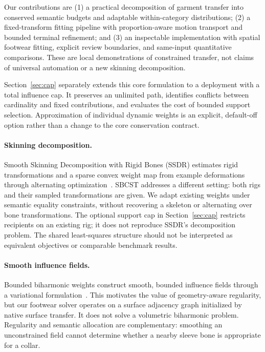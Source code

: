 \documentclass[10pt,twocolumn,letterpaper]{article}
\makeatletter
\renewcommand\section{\@startsection{section}{1}{\z@}{-2.0ex plus -.5ex minus -.2ex}{.9ex plus .2ex}{\normalfont\large\bfseries\raggedright}}
\makeatother
\begin{document}
Our contributions are (1) a practical decomposition of garment transfer into conserved semantic budgets and adaptable within-category distributions; (2) a fixed-transform fitting pipeline with proportion-aware motion transport and bounded terminal refinement; and (3) an inspectable implementation with spatial footwear fitting, explicit review boundaries, and same-input quantitative comparisons. These are local demonstrations of constrained transfer, not claims of universal automation or a new skinning decomposition.

Section~\ref{sec:cap} separately extends this core formulation to a deployment with a total influence cap. It preserves an unlimited path, identifies conflicts between cardinality and fixed contributions, and evaluates the cost of bounded support selection. Approximation of individual dynamic weights is an explicit, default-off option rather than a change to the core conservation contract.



\section{Related Work and Scope}
\paragraph{Skinning decomposition.}
Smooth Skinning Decomposition with Rigid Bones (SSDR) estimates rigid transformations and a sparse convex weight map from example deformations through alternating optimization~\cite{ssdr}. SBCST addresses a different setting: both rigs and their sampled transformations are given. We adapt existing weights under semantic equality constraints, without recovering a skeleton or alternating over bone transformations. The optional support cap in Section~\ref{sec:cap} restricts recipients on an existing rig; it does not reproduce SSDR's decomposition problem. The shared least-squares structure should not be interpreted as equivalent objectives or comparable benchmark results.

\paragraph{Smooth influence fields.}
Bounded biharmonic weights construct smooth, bounded influence fields through a variational formulation~\cite{bbw}. This motivates the value of geometry-aware regularity, but our footwear solver operates on a surface adjacency graph initialized by native surface transfer. It does not solve a volumetric biharmonic problem. Regularity and semantic allocation are complementary: smoothing an unconstrained field cannot determine whether a nearby sleeve bone is appropriate for a collar.
\end{document}
